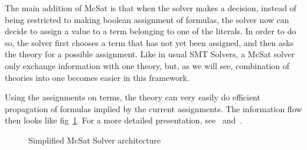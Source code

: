 \documentclass{article}
\begin{document}
The main addition of McSat is that when the solver makes a decision, instead of
being restricted to making boolean assignment of formulas, the solver now can
decide to assign a value to a term belonging to one of the literals. In order to do so,
the solver first chooses a term that has not yet been assigned, and then asks
the theory for a possible assignment. Like in usual SMT Solvers, a McSat solver
only exchange information with one theory, but, as we will see, combination
of theories into one becomes easier in this framework.

Using the assignments on terms, the theory can very easily do efficient
propagation of formulas implied by the current assignments.
The information flow then looks like fig~\ref{fig:mcsat_flow}.
For a more detailed presentation, see~\cite{FMCAD13} and~\cite{VMCAI13}.

\begin{figure}
  \begin{center}
  \end{center}
  \caption{Simplified McSat Solver architecture}\label{fig:mcsat_flow}
\end{figure}
\end{document}
